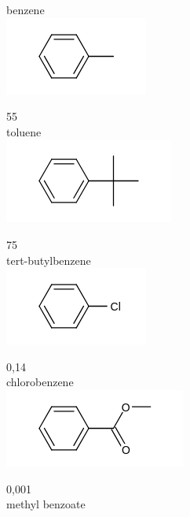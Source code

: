 \documentclass[10pt]{article}
\begin{document}
benzene\\
\includegraphics{smile-e485dd6ad92b1d0733061844c9a75a820b823c1c}

55\\
toluene\\
\includegraphics{smile-c8932c6fbbbab5a6ed66d67dfbaa6a83f5e17f09}

75\\
tert-butylbenzene\\
\includegraphics{smile-e2401695b6a5fa730a2f22cc2836c9ac2d84e254}

0,14\\
chlorobenzene\\
\includegraphics{smile-688c8a55d789adc73821459f4df92db325df1969}

0,001\\
methyl benzoate
\end{document}
